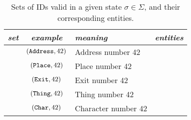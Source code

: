 \bgroup
\def\arraystretch{1.5}
\begin{table}
  \centering
{\footnotesize
  \begin{tabular}{|l|c|l|l|}
    \hline
    {\em set} &
    {\em example} &
    {\em meaning} &
    {\em entities}
    \\ \hline \hline

      \addressidset{\sigma} &
      $ (\texttt{Address}, 42) $ &
      Address number 42 &
      \addressset{\sigma}
      \\ \hline

      \placeidset{\sigma} &
      $ (\texttt{Place}, 42) $ &
      Place number 42 &
      \placeset{\sigma}
      \\ \hline

      \exitidset{\sigma} &
      $ (\texttt{Exit}, 42) $ &
      Exit number 42 &
      \exitset{\sigma}
      \\ \hline

      \thingidset{\sigma} &
      $ (\texttt{Thing}, 42) $ &
      Thing number 42 &
      \thingset{\sigma}
      \\ \hline

      \charidset{\sigma} &
      $ (\texttt{Char}, 42) $ &
      Character number 42 &
      \charset{\sigma}
      \\ \hline

\end{tabular}
} %
  \caption{\label{tab:ids}Sets of IDs valid in a given state $\sigma
    \in \Sigma$, and their corresponding entities.}
\end{table}
\egroup

